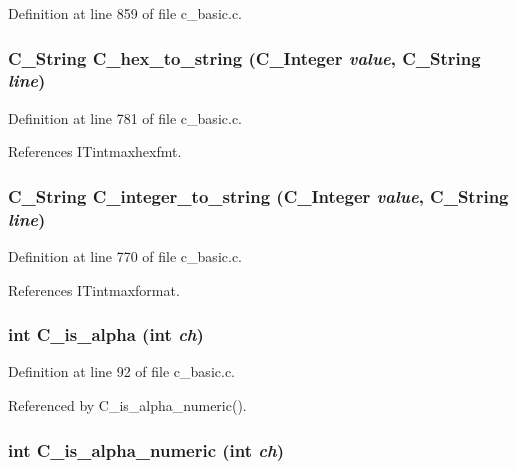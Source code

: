 Definition at line 859 of file c\_\-basic.c.
\subsubsection{\setlength{\rightskip}{0pt plus 5cm}\bf{C\_\-String} C\_\-hex\_\-to\_\-string (\bf{C\_\-Integer} {\em value}, \bf{C\_\-String} {\em line})}\label{c__basic_8h_1362ed3d1dd6504198ea23205cfc85f7}




Definition at line 781 of file c\_\-basic.c.

References ITintmaxhexfmt.
\subsubsection{\setlength{\rightskip}{0pt plus 5cm}\bf{C\_\-String} C\_\-integer\_\-to\_\-string (\bf{C\_\-Integer} {\em value}, \bf{C\_\-String} {\em line})}\label{c__basic_8h_8bb8098660f720014870c6a10abeaf62}




Definition at line 770 of file c\_\-basic.c.

References ITintmaxformat.
\subsubsection{\setlength{\rightskip}{0pt plus 5cm}int C\_\-is\_\-alpha (int {\em ch})}\label{c__basic_8h_b41e507db5ccf2e1e2550123f8029ddb}




Definition at line 92 of file c\_\-basic.c.

Referenced by C\_\-is\_\-alpha\_\-numeric().
\subsubsection{\setlength{\rightskip}{0pt plus 5cm}int C\_\-is\_\-alpha\_\-numeric (int {\em ch})}\label{c__basic_8h_47689baf335fe031f10020c177d153aa}




